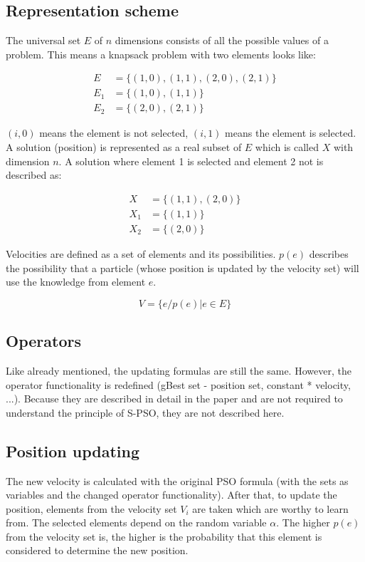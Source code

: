 \documentclass{article}
\begin{document}
\subsection{Representation scheme}
The universal set $E$ of $n$ dimensions consists of all the possible values of a problem. This means a knapsack problem with two elements looks like:

\begin{equation}
\begin{aligned}
E &= \{(1,0),(1,1),(2,0),(2,1)\}\\
E_1 &= \{(1,0),(1,1)\}\\
E_2 &= \{(2,0),(2,1)\}
\end{aligned}
\end{equation}

$(i,0)$ means the element is not selected, $(i,1)$ means the element is selected. A solution (position) is represented as a real subset of $E$ which is called $X$ with dimension $n$. A solution where element 1 is selected and element 2 not is described as:

\begin{equation}
\begin{aligned}
X &= \{(1,1),(2,0)\}\\
X_1 &= \{(1,1)\}\\
X_2 &= \{(2,0)\}
\end{aligned}
\end{equation}

Velocities are defined as a set of elements and its possibilities. $p(e)$ describes the possibility that a particle (whose position is updated by the velocity set) will use the knowledge from element $e$.

\begin{equation}
V = \{e/p(e)| e \in E\}
\end{equation}

\subsection{Operators}
Like already mentioned, the updating formulas are still the same. However, the operator functionality is redefined (gBest set - position set, constant * velocity, ...). Because they are described in detail in the paper and are not required to understand the principle of S-PSO, they are not described here.

\subsection{Position updating}
The new velocity is calculated with the original PSO formula (with the sets as variables and the changed operator functionality). After that, to update the position, elements from the velocity set $V_i$ are taken which are worthy to learn from. The selected elements depend on the random variable $\alpha$. The higher $p(e)$ from the velocity set is, the higher is the probability that this element is considered to determine the new position.
\end{document}
